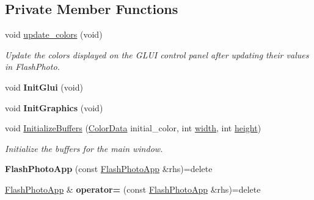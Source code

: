 \subsection*{Private Member Functions}
\begin{DoxyCompactItemize}
\item 
void \hyperlink{classimage__tools_1_1FlashPhotoApp_a4d51fdabaff836fc55a4f72a465773e7}{update\+\_\+colors} (void)\hypertarget{classimage__tools_1_1FlashPhotoApp_a4d51fdabaff836fc55a4f72a465773e7}{}\label{classimage__tools_1_1FlashPhotoApp_a4d51fdabaff836fc55a4f72a465773e7}

\begin{DoxyCompactList}\small\item\em Update the colors displayed on the G\+L\+UI control panel after updating their values in Flash\+Photo. \end{DoxyCompactList}\item 
void {\bfseries Init\+Glui} (void)\hypertarget{classimage__tools_1_1FlashPhotoApp_a7e66fc64a72ba17648cb99491c773c9b}{}\label{classimage__tools_1_1FlashPhotoApp_a7e66fc64a72ba17648cb99491c773c9b}

\item 
void {\bfseries Init\+Graphics} (void)\hypertarget{classimage__tools_1_1FlashPhotoApp_ac529b21d6c3466ed1b40cc159b172d0d}{}\label{classimage__tools_1_1FlashPhotoApp_ac529b21d6c3466ed1b40cc159b172d0d}

\item 
void \hyperlink{classimage__tools_1_1FlashPhotoApp_a08e318814d7f7fb1aa2c05a61711f672}{Initialize\+Buffers} (\hyperlink{classimage__tools_1_1ColorData}{Color\+Data} initial\+\_\+color, int \hyperlink{classimage__tools_1_1BaseGfxApp_a2fe403c5392f624477c2ce4429f1a7b5}{width}, int \hyperlink{classimage__tools_1_1BaseGfxApp_aa961e13a7a8e6062204223cc33ac7503}{height})\hypertarget{classimage__tools_1_1FlashPhotoApp_a08e318814d7f7fb1aa2c05a61711f672}{}\label{classimage__tools_1_1FlashPhotoApp_a08e318814d7f7fb1aa2c05a61711f672}

\begin{DoxyCompactList}\small\item\em Initialize the buffers for the main window. \end{DoxyCompactList}\item 
{\bfseries Flash\+Photo\+App} (const \hyperlink{classimage__tools_1_1FlashPhotoApp}{Flash\+Photo\+App} \&rhs)=delete\hypertarget{classimage__tools_1_1FlashPhotoApp_a3009fefcee5cd98e46e6b4dc3b3cf6be}{}\label{classimage__tools_1_1FlashPhotoApp_a3009fefcee5cd98e46e6b4dc3b3cf6be}

\item 
\hyperlink{classimage__tools_1_1FlashPhotoApp}{Flash\+Photo\+App} \& {\bfseries operator=} (const \hyperlink{classimage__tools_1_1FlashPhotoApp}{Flash\+Photo\+App} \&rhs)=delete\hypertarget{classimage__tools_1_1FlashPhotoApp_a9ecfbf7bd80d0ef20ba5cf6b61538699}{}\label{classimage__tools_1_1FlashPhotoApp_a9ecfbf7bd80d0ef20ba5cf6b61538699}

\end{DoxyCompactItemize}
